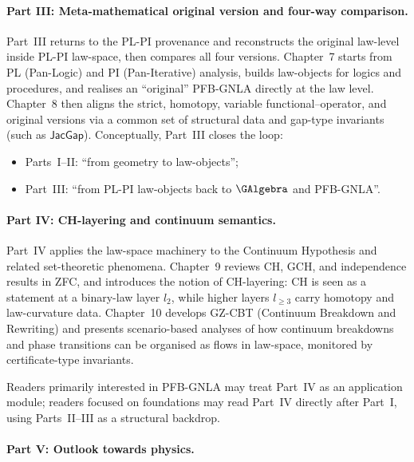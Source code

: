 \documentclass[11pt]{book}
\theoremstyle{plain}
\theoremstyle{definition}
\begin{document}
\paragraph*{Part III: Meta-mathematical original version and four-way comparison.}


Part~III returns to the PL-PI provenance and reconstructs the original
law-level \GAlgebra inside PL-PI law-space, then compares all four
versions. Chapter~7 starts from PL (Pan-Logic) and PI (Pan-Iterative)
analysis, builds law-objects for logics and procedures, and realises an
“original” PFB-GNLA directly at the law level. Chapter~8 then aligns
the strict, homotopy, variable functional–operator, and original
versions via a common set of structural data and gap-type invariants
(such as $\mathsf{JacGap}$). Conceptually, Part~III closes the loop:



\begin{itemize}
  \item Parts~I–II: “from geometry to law-objects”;
  \item Part~III: “from PL-PI law-objects back to $\GAlgebra$ and PFB-GNLA”.
\end{itemize}



\paragraph*{Part IV: CH-layering and continuum semantics.}


Part~IV applies the law-space machinery to the Continuum Hypothesis and
related set-theoretic phenomena. Chapter~9 reviews CH, GCH, and
independence results in ZFC, and introduces the notion of CH-layering:
CH is seen as a statement at a binary-law layer $l_2$, while higher
layers $l_{\ge3}$ carry homotopy and law-curvature data. Chapter~10
develops GZ-CBT (Continuum Breakdown and Rewriting) and presents
scenario-based analyses of how continuum breakdowns and phase transitions
can be organised as flows in law-space, monitored by certificate-type
invariants.



Readers primarily interested in PFB-GNLA may treat Part~IV as an
application module; readers focused on foundations may read Part~IV
directly after Part~I, using Parts~II–III as a structural backdrop.



\paragraph*{Part V: Outlook towards physics.}
\end{document}

